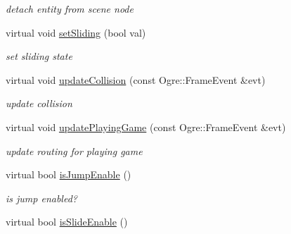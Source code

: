 \begin{DoxyCompactItemize}
\begin{DoxyCompactList}\small\item\em detach entity from scene node \end{DoxyCompactList}\item 
virtual void \hyperlink{class_n_c_t_u_1_1_player_obstacle_a981883a7b5e6e74b5b95f782710ca46c}{set\+Sliding} (bool val)\hypertarget{class_n_c_t_u_1_1_player_obstacle_a981883a7b5e6e74b5b95f782710ca46c}{}\label{class_n_c_t_u_1_1_player_obstacle_a981883a7b5e6e74b5b95f782710ca46c}

\begin{DoxyCompactList}\small\item\em set sliding state \end{DoxyCompactList}\item 
virtual void \hyperlink{class_n_c_t_u_1_1_player_obstacle_a90dacefcf4d1cf920889c90ae8221c87}{update\+Collision} (const Ogre\+::\+Frame\+Event \&evt)\hypertarget{class_n_c_t_u_1_1_player_obstacle_a90dacefcf4d1cf920889c90ae8221c87}{}\label{class_n_c_t_u_1_1_player_obstacle_a90dacefcf4d1cf920889c90ae8221c87}

\begin{DoxyCompactList}\small\item\em update collision \end{DoxyCompactList}\item 
virtual void \hyperlink{class_n_c_t_u_1_1_player_obstacle_a70fcbfee6373a13a64b335f096a9dff3}{update\+Playing\+Game} (const Ogre\+::\+Frame\+Event \&evt)\hypertarget{class_n_c_t_u_1_1_player_obstacle_a70fcbfee6373a13a64b335f096a9dff3}{}\label{class_n_c_t_u_1_1_player_obstacle_a70fcbfee6373a13a64b335f096a9dff3}

\begin{DoxyCompactList}\small\item\em update routing for playing game \end{DoxyCompactList}\item 
virtual bool \hyperlink{class_n_c_t_u_1_1_player_obstacle_a363f8eede24bc091b7bbb645405ab400}{is\+Jump\+Enable} ()\hypertarget{class_n_c_t_u_1_1_player_obstacle_a363f8eede24bc091b7bbb645405ab400}{}\label{class_n_c_t_u_1_1_player_obstacle_a363f8eede24bc091b7bbb645405ab400}

\begin{DoxyCompactList}\small\item\em is jump enabled? \end{DoxyCompactList}\item 
virtual bool \hyperlink{class_n_c_t_u_1_1_player_obstacle_ae0a89357232680fc3d9f673a9a41cc0e}{is\+Slide\+Enable} ()\hypertarget{class_n_c_t_u_1_1_player_obstacle_ae0a89357232680fc3d9f673a9a41cc0e}{}\label{class_n_c_t_u_1_1_player_obstacle_ae0a89357232680fc3d9f673a9a41cc0e}


\end{DoxyCompactItemize}
